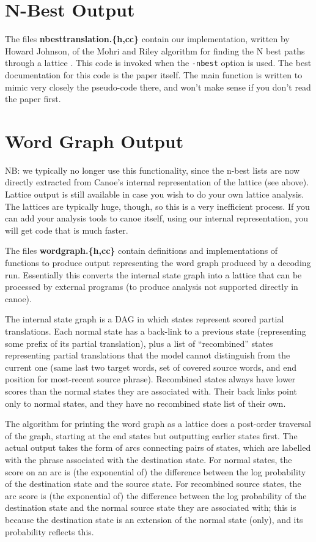 \documentclass[12pt]{amsart} \usepackage{epsfig} \usepackage{rotating}
\newcommand{\file}{\textbf} \newcommand{\url}{\underline}
\newcommand{\code}{\small\texttt}
\begin{document}
\section{N-Best Output}
The files \file{nbesttranslation.\{h,cc\}} contain our implementation, written
by Howard Johnson, of the Mohri and Riley algorithm for finding the N best
paths through a lattice \cite{mohri02}.   This code is invoked when the
\code{-nbest} option is used.  The best documentation for this code is the
paper itself.  The main function is written to mimic very closely the
pseudo-code there, and won't make sense if you don't read the paper first.

\section{Word Graph Output}
NB: we typically no longer use this functionality, since the n-best lists are
now directly extracted from Canoe's internal representation of the lattice (see
above).  Lattice output is still available in case you wish to do your own
lattice analysis.  The lattices are typically huge, though, so this is a very
inefficient process.  If you can add your analysis tools to canoe itself, using
our internal representation, you will get code that is much faster.

The files \file{wordgraph.\{h,cc\}} contain definitions and implementations of
functions to produce output representing the word graph produced by a decoding
run. Essentially this converts the internal state graph into a lattice that can
be processed by external programs (to produce analysis not supported directly
in canoe).

The internal state graph is a DAG in which states represent scored partial
translations. Each normal state has a back-link to a previous state
(representing some prefix of its partial translation), plus a list of
``recombined'' states representing partial translations that the model cannot
distinguish from the current one (same last two target words, set of covered
source words, and end position for most-recent source phrase).  Recombined
states always have lower scores than the normal states they are associated
with. Their back links point only to normal states, and they have no recombined
state list of their own.

The algorithm for printing the word graph as a lattice does a post-order
traversal of the graph, starting at the end states but outputting earlier
states first. The actual output takes the form of arcs connecting pairs of
states, which are labelled with the phrase associated with the destination
state. For normal states, the score on an arc is (the exponential of) the
difference between the log probability of the destination state and the source
state. For recombined source states, the arc score is (the exponential of) the
difference between the log probability of the destination state and the normal
source state they are associated with; this is because the destination state is
an extension of the normal state (only), and its probability reflects this.
\end{document}
